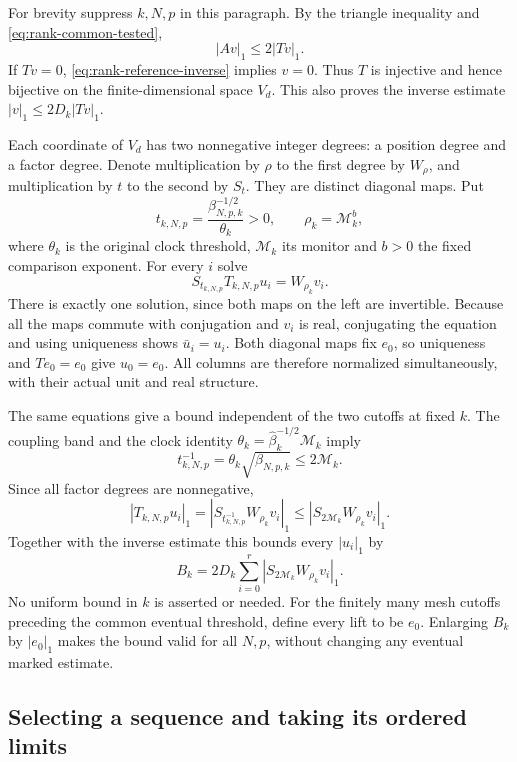 For brevity suppress $k,N,p$ in this paragraph. By the triangle inequality
and \eqref{eq:rank-common-tested},
\[
                         |Av|_1\le2|Tv|_1.
\]
If $Tv=0$, \eqref{eq:rank-reference-inverse} implies $v=0$.
Thus $T$ is injective and hence bijective on the finite-dimensional space
$V_d$. This also proves the inverse estimate $|v|_1\le2D_k|Tv|_1$.

Each coordinate of $V_d$ has two nonnegative integer degrees: a position
degree and a factor degree. Denote multiplication by $\rho$ to the first
degree by $W_\rho$, and multiplication by $t$ to the second by $S_t$.
They are distinct diagonal maps. Put
\[
 t_{k,N,p}=\frac{\beta_{N,p,k}^{-1/2}}{\theta_k}>0,
 \qquad \rho_k=\mathcal M_k^b,
\]
where $\theta_k$ is the original clock threshold, $\mathcal M_k$ its
monitor and $b>0$ the fixed comparison exponent. For every $i$ solve
\begin{equation}\label{eq:rank-common-lifts}
                  S_{t_{k,N,p}}T_{k,N,p}u_i=W_{\rho_k}v_i.
\end{equation}
There is exactly one solution, since both maps on the left are
invertible. Because all the maps commute with conjugation and $v_i$ is
real, conjugating the equation and using uniqueness shows $\bar u_i=u_i$.
Both diagonal maps fix $e_0$, so uniqueness and $Te_0=e_0$ give $u_0=e_0$.
All columns are therefore normalized simultaneously, with their actual
unit and real structure.

The same equations give a bound independent of the two cutoffs at fixed
$k$. The coupling band and the clock identity
$\theta_k=\widehat\beta_k^{-1/2}\mathcal M_k$ imply
\[
            t_{k,N,p}^{-1}
            =\theta_k\sqrt{\beta_{N,p,k}}\le2\mathcal M_k.
\]
Since all factor degrees are nonnegative,
\[
 |T_{k,N,p}u_i|_1
 =|S_{t_{k,N,p}^{-1}}W_{\rho_k}v_i|_1
 \le |S_{2\mathcal M_k}W_{\rho_k}v_i|_1.
\]
Together with the inverse estimate this bounds every $|u_i|_1$ by
\begin{equation}\label{eq:rank-fixed-scale-bounded}
            B_k=2D_k\sum_{i=0}^r
                        |S_{2\mathcal M_k}W_{\rho_k}v_i|_1.
\end{equation}
No uniform bound in $k$ is asserted or needed. For the finitely many mesh
cutoffs preceding the common eventual threshold, define every lift to be
$e_0$. Enlarging $B_k$ by $|e_0|_1$ makes the bound valid for all $N,p$,
without changing any eventual marked estimate.

\subsection{Selecting a sequence and taking its ordered limits}

